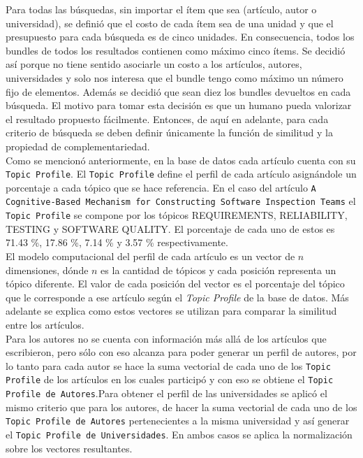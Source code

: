 Para todas las búsquedas, sin importar el ítem que sea (artículo, autor o universidad), se definió que el costo de cada ítem sea de una unidad y que el presupuesto para cada búsqueda es de cinco unidades. En consecuencia, todos los bundles de todos los resultados contienen como máximo cinco ítems. Se decidió así porque no tiene sentido asociarle un costo a los artículos, autores, universidades y solo nos interesa que el bundle tengo como máximo un número fijo de elementos. Además se decidió que sean diez los bundles devueltos en cada búsqueda. El motivo para tomar esta decisión es que un humano pueda valorizar el resultado propuesto fácilmente. Entonces, de aquí en adelante, para cada criterio de búsqueda se deben definir únicamente la función de similitud y la propiedad de complementariedad.\\

Como se mencionó anteriormente, en la base de datos cada artículo cuenta con su \texttt{Topic Profile}. El \texttt{Topic Profile} define el perfil de cada artículo asignándole un porcentaje a cada tópico que se hace referencia. En el caso del artículo \texttt{A Cognitive-Based Mechanism for Constructing Software Inspection Teams} el \texttt{Topic Profile} se compone por los tópicos  REQUIREMENTS, RELIABILITY, TESTING y SOFTWARE QUALITY. El porcentaje de cada uno de estos es 71.43 \%, 17.86 \%, 7.14 \% y 3.57 \% respectivamente.\\

El modelo computacional del perfil de cada artículo es un vector de $n$ dimensiones, dónde $n$ es la cantidad de tópicos y cada posición representa un tópico diferente. El valor de cada posición del vector es el porcentaje del tópico que le corresponde a ese artículo según el \textit{Topic Profile} de la base de datos. Más adelante se explica como estos vectores se utilizan para comparar la similitud entre los artículos.\\

Para los autores no se cuenta con información más allá de los artículos que escribieron, pero sólo con eso alcanza para poder generar un perfil de autores, por lo tanto para cada autor se hace la suma vectorial de cada uno de los \texttt{Topic Profile} de los artículos en los cuales participó y con eso se obtiene el \texttt{Topic Profile de Autores}.Para obtener el perfil de las universidades se aplicó el mismo criterio que para los autores, de hacer la suma vectorial de cada uno de los \texttt{Topic Profile de Autores} pertenecientes a la misma universidad y así generar el \texttt{Topic Profile de Universidades}. En ambos casos se aplica la normalización sobre los vectores resultantes.

